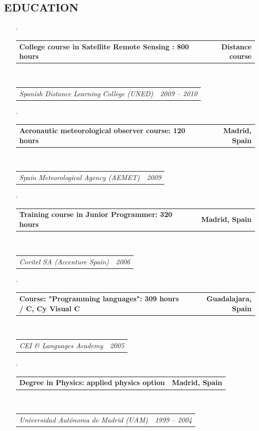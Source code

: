 \documentclass[9pt,letterpaper]{extreport}
\makeatletter
\newcommand{\headerrow}[2]
{\begin{tabular*}{\linewidth}{l@{\extracolsep{\fill}}r}
	#1 &
	#2 \\
\end{tabular*}}
\newcommand{\CPP}
{C\nolinebreak[4]\hspace{-.05em}\raisebox{.22ex}{\footnotesize\bf ++}}
\makeatother
\begin{document}
\vspace{-1em}
\subsection*{\textcolor{NavyBlue}{ \fontsize{12pt}{20pt}\selectfont \textbf{EDUCATION} }}



\begin{itemize}
	\parskip=0.1em

	\item[$\cdot$] 
	\headerrow
		{\textbf{College course in Satellite Remote Sensing : 800 hours}}
		{\textbf{Distance course}}
	\\
	\headerrow
		{\emph{Spanish Distance Learning College (UNED)}}
		{\emph{2009 -- 2010}}

	\item[$\cdot$]
	\headerrow
		{\textbf{Aeronautic meteorological observer course: 120 hours}}
		{\textbf{Madrid, Spain}}
	\\
	\headerrow
		{\emph{Spain Meteorological Agency (AEMET)}}
		{\emph{2009}}
	
    \item[$\cdot$] 
    \headerrow
    	{\textbf{Training course in Junior Programmer: 320 hours}}
		{\textbf{Madrid, Spain}}
	\\
	\headerrow
		{\emph{Coritel SA (Accenture Spain)}}
		{\emph{2006}}
	
	
	\item[$\cdot$] 
	\headerrow
		{\textbf{Course: "Programming languages": 309 hours / C, \CPP y Visual \CPP}}
		{\textbf{Guadalajara, Spain}}
	\\
	\headerrow
		{\emph{CEI \& Languages Academy }}
		{\emph{2005}}
	
	\item[$\cdot$] 
	\headerrow
		{\textbf{Degree in Physics: applied physics option}}
		{\textbf{Madrid, Spain}}
	\\
	\headerrow
		{\emph{Universidad Autónoma de Madrid (UAM)}}
		{\emph{1999 -- 2004}}
		
\end{itemize}
\end{document}
